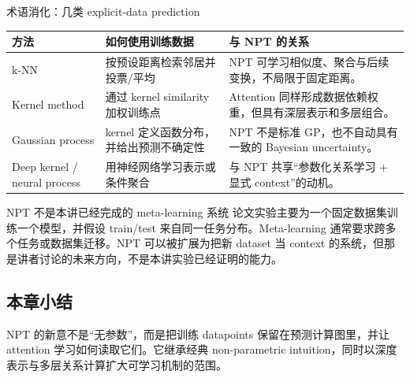 \begin{knowledgebox}{术语消化：几类 explicit-data prediction}
\begin{tabularx}{\textwidth}{L{0.20\textwidth}L{0.27\textwidth}X}
\toprule
方法 & 如何使用训练数据 & 与 NPT 的关系 \\
\midrule
k-NN & 按预设距离检索邻居并投票/平均 & NPT 可学习相似度、聚合与后续变换，不局限于固定距离。 \\
Kernel method & 通过 kernel similarity 加权训练点 & Attention 同样形成数据依赖权重，但具有深层表示和多层组合。 \\
Gaussian process & kernel 定义函数分布，并给出预测不确定性 & NPT 不是标准 GP，也不自动具有一致的 Bayesian uncertainty。 \\
Deep kernel / neural process & 用神经网络学习表示或条件聚合 & 与 NPT 共享“参数化关系学习 + 显式 context”的动机。 \\
\bottomrule
\end{tabularx}
\end{knowledgebox}


\begin{warningbox}{NPT 不是本讲已经完成的 meta-learning 系统}
论文实验主要为一个固定数据集训练一个模型，并假设 train/test 来自同一任务分布。Meta-learning 通常要求跨多个任务或数据集迁移。NPT 可以被扩展为把新 dataset 当 context 的系统，但那是讲者讨论的未来方向，不是本讲实验已经证明的能力。
\end{warningbox}


\subsection{本章小结}

NPT 的新意不是“无参数”，而是把训练 datapoints 保留在预测计算图里，并让 attention 学习如何读取它们。它继承经典 non-parametric intuition，同时以深度表示与多层关系计算扩大可学习机制的范围。

